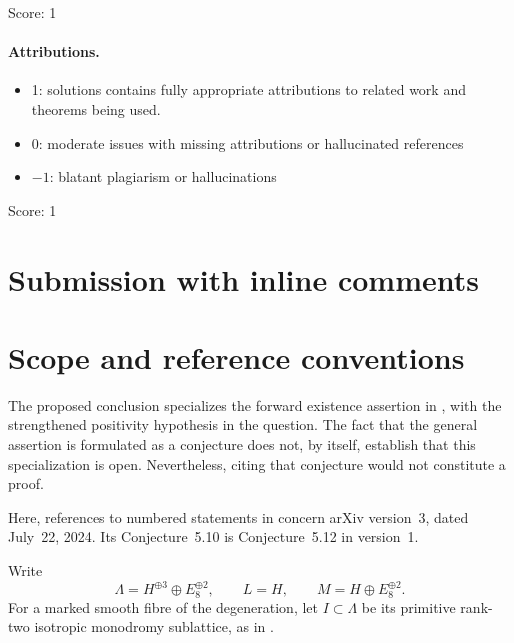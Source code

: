 \documentclass[11pt]{article}
\theoremstyle{remark}
\begin{document}
\noindent Score: 1

\paragraph{Attributions.}
\begin{itemize}
	\item  1: solutions contains fully appropriate attributions
		to related work and theorems being used.
	\item  0: moderate issues with missing attributions or hallucinated references
	\item  $-1$: blatant plagiarism or hallucinations
\end{itemize}

\noindent Score: 1

\newpage
\section{Submission with inline comments}


\begin{abstract}
I cannot provide a complete proof of the assertion in the question.
The argument below establishes its lattice-theoretic prerequisites and
identifies the remaining geometric existence problem.  It is not a proof
of the requested theorem.
\end{abstract}

\section{Scope and reference conventions}

The proposed conclusion specializes the forward existence assertion in
\cite[Conjecture~5.10]{GT24}, with the strengthened positivity hypothesis
in the question.
The fact that the general assertion is formulated as a conjecture does
not, by itself, establish that this specialization is open.
Nevertheless, citing that conjecture would not constitute a proof.

Here, references to numbered statements in \cite{GT24} concern
arXiv version~3, dated July~22, 2024.  Its Conjecture~5.10 is
Conjecture~5.12 in version~1.

Write
\[
 \Lambda=H^{\oplus 3}\oplus E_8^{\oplus 2},
 \qquad L=H,
 \qquad M=H\oplus E_8^{\oplus 2}.
\]
For a marked smooth fibre of the degeneration, let
\(I\subset\Lambda\) be its primitive rank-two isotropic monodromy
sublattice, as in \cite[Section~3.1]{GT24}.
\end{document}

